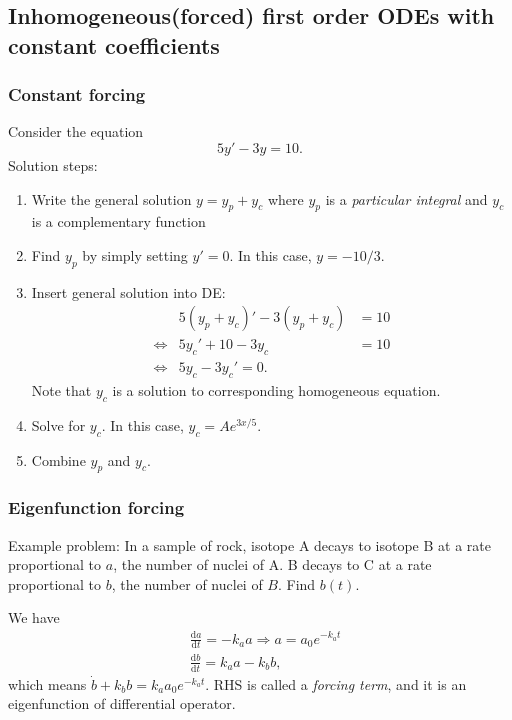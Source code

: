 \documentclass[a4paper]{article}
\begin{document}
    \subsection{Inhomogeneous(forced) first order ODEs with constant coefficients}
    \subsubsection{Constant forcing}
    \begin{example}
        Consider the equation 
        \[
            5y'-3y=10
        .\]
        Solution steps:
        \begin{enumerate}
            \item Write the general solution $ y=y_p+y_c $ where $y_p$ is a \textit{particular integral} and $y_c$ is a complementary function
            \item Find $ y_p $ by simply setting $y'=0$. In this case, $y=-10/3$.
            \item Insert general solution into DE:
            \[
              \begin{aligned}
                   &5(y_p+y_c)'-3(y_p+y_c)&=10\\
                   \Longleftrightarrow & 5y_c'+10-3y_c&=10\\
                    \Longleftrightarrow & 5y_c-3y_c'=0.
              \end{aligned}  
            \]
            Note that $ y_c $ is a solution to corresponding homogeneous equation.
            \item Solve for $y_c$. In this case, $y_c=Ae^{3x/5}$.
            \item Combine $y_p$ and $y_c$.
        \end{enumerate}
    \end{example}
    \subsubsection{Eigenfunction forcing}
    Example problem: In a sample of rock, isotope A decays to isotope B at a rate proportional to $a$, the number of nuclei of A. B decays to C at a rate proportional to $b$, the number of nuclei of $B$. Find $b(t)$.
    
    We have 
    \[
        \begin{aligned}
            &\frac{\mathrm{d}a}{\mathrm{d}t} = -k_a a \Longrightarrow  a = a_0 e^{-k_a t}\\
            &\frac{\mathrm{d}b}{\mathrm{d}t} = k_a a -k_b b, 
        \end{aligned}
    \]
    which means $ \dot{b}+k_b b=k_a a_0 e^{-k_a t} $. RHS is called a \textit{forcing term}, and it is an eigenfunction of differential operator.
\end{document}
